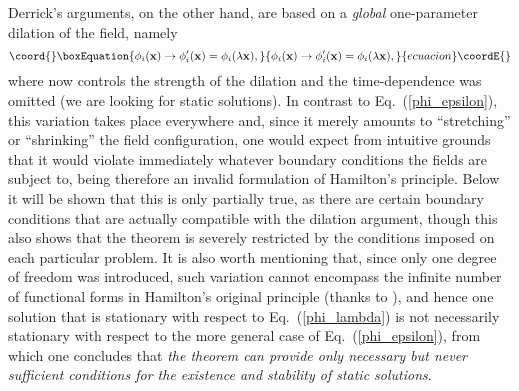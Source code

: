 \documentclass[a4paper,prd,twocolumn,showpacs,amsmath]{revtex4}
\providecommand{\vecx}{{\bf x}}
\begin{document}
Derrick's arguments, on the other hand, are based on a {\em global} one-parameter dilation of the
field, namely
\begin{equation}\coord{}\boxEquation{ \label{phi_lambda}
  \phi_i(\vecx) \to \phi'_i(\vecx) = \phi_i(\lambda \vecx),
}{ \phi_i(\vecx) \to \phi'_i(\vecx) = \phi_i(\lambda \vecx),
}{ecuacion}\coordE{}\end{equation}
where now \myHighlight{$\lambda$}\coordHE{} controls the strength of the dilation and the time-dependence was omitted (we are looking
for static solutions).
In contrast to Eq.~(\ref{phi_epsilon}), this variation takes place everywhere and, since it merely amounts to
``stretching'' or ``shrinking'' the field configuration, one would expect from intuitive grounds that it
would violate immediately whatever boundary conditions the fields are subject to, being therefore an invalid
formulation of Hamilton's principle.
Below it will be shown that this is only partially true, as there are certain boundary conditions
that are actually compatible with the dilation argument, though this also shows that the theorem is
severely restricted by the conditions imposed on each particular problem.
It is also worth mentioning that, since only one degree of freedom was introduced, such variation
cannot encompass the infinite number of functional forms in Hamilton's original principle (thanks to
\myHighlight{$\eta_i(\vecx)$}\coordHE{}), and hence one solution that is
stationary with respect to Eq.~(\ref{phi_lambda}) is not necessarily stationary with respect to
the more general case of Eq.~(\ref{phi_epsilon}), from which one concludes that {\em the theorem can provide
only necessary but never sufficient conditions for the existence and stability of static solutions}.
\end{document}
